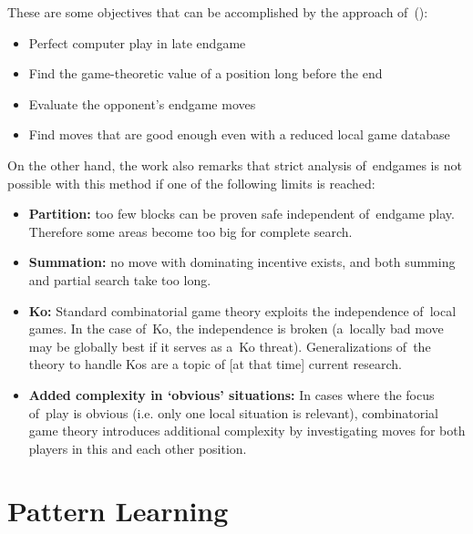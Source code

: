 These are some objectives that can be accomplished by the approach of~(\cite{Muller1995computer}):
\begin{itemize}
  \item Perfect computer play in late endgame
  \item Find the game-theoretic value of a position long before the end
  \item Evaluate the opponent’s endgame moves
  \item Find moves that are good enough even with a reduced local game database
\end{itemize}
On the other hand, the work also remarks that strict analysis of~endgames is not possible with this method if one of the following limits is reached:
\begin{itemize}
  \item \textbf{Partition:}
    too few blocks can be proven safe independent of~endgame play.
    Therefore some areas become too big for complete search.
  \item \textbf{Summation:}
    no move with dominating incentive exists, and both summing and partial search take too long.
  \item \textbf{Ko:}
    Standard combinatorial game theory exploits the independence of~local games.
    In the case of~Ko, the independence is broken (a~locally bad move may be globally best if it serves as a~Ko threat).
    Generalizations of~the theory to handle Kos are a topic of [at that time] current research.
  \item \textbf{Added complexity in ‘obvious’ situations:}
    In cases where the focus of~play is obvious (i.e. only one local situation is relevant), combinatorial game theory introduces additional complexity by investigating moves for both players in this and each other position.
\end{itemize}

\section{Pattern Learning}

